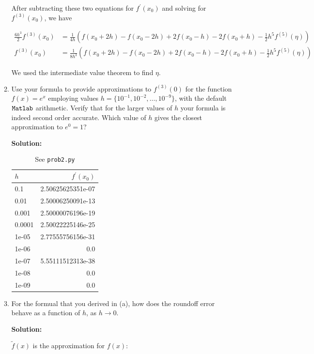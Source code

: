 \documentclass[12pt]{article}
\begin{document}
\begin{enumerate}
\begin{enumerate}
After subtracting these two equations for $f^{\prime}(x_{0})$ and solving for $f^{(3)}(x_{0})$, we have

\begin{align*}
\frac{6h^{3}}{2}f^{(3)}(x_{0}) &= \frac{1}{4h}\left( f(x_{0} + 2h) - f(x_{0} - 2h) + 2f(x_{0} - h) - 2f(x_{0} + h) - \frac{1}{2}h^{5}f^{(5)}(\eta)\right)\\
f^{(3)}(x_{0}) &=\frac{1}{8h^{3}}\left( f(x_{0} + 2h) - f(x_{0} - 2h) + 2f(x_{0} - h) - 2f(x_{0} + h) - \frac{1}{2}h^{5}f^{(5)}(\eta)\right)
\end{align*}

We used the intermediate value theorem to find $\eta$. 

\item Use your formula to provide approximations to $f^{(3)}(0)$ for the function $f(x) = e^{x}$ employing values $h = \{ 10^{-1}, 10^{-2}, \ldots, 10^{-9}\}$, with the default ${\tt Matlab}$ arithmetic. Verify that for the larger values of $h$ your formula is indeed second order accurate. Which value of $h$ gives the closest approximation to $e^{0} = 1$?

{\bf Solution:}

\begin{table}[H]
\centering
\begin{tabular}{l r}
\hline \hline
$h$ & $f^{\prime}(x_{0})$\\
\hline
0.1 & 2.50625625351e-07\\
0.01 & 2.50006250091e-13\\
0.001 & 2.50000076196e-19\\
0.0001 & 2.50022225146e-25\\
1e-05 & 2.77555756156e-31\\
1e-06 & 0.0\\
1e-07 & 5.55111512313e-38\\
1e-08 & 0.0\\
1e-09 & 0.0\\
\hline
\end{tabular}
\caption{See {\tt prob2.py}}
\end{table}

\item For the formual that you derived in (a), how does the roundoff error behave as a function of $h$, as $h\rightarrow 0$.

{\bf Solution:}

$\widetilde{f}(x)$ is the approximation for $f(x)$:


\end{enumerate}
\end{enumerate}
\end{document}
